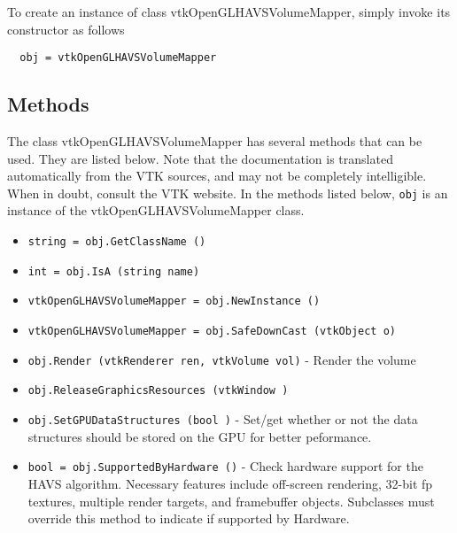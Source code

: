 To create an instance of class vtkOpenGLHAVSVolumeMapper, simply
invoke its constructor as follows
\begin{verbatim}
  obj = vtkOpenGLHAVSVolumeMapper
\end{verbatim}
\subsection{Methods}

The class vtkOpenGLHAVSVolumeMapper has several methods that can be used.
  They are listed below.
Note that the documentation is translated automatically from the VTK sources,
and may not be completely intelligible.  When in doubt, consult the VTK website.
In the methods listed below, \verb|obj| is an instance of the vtkOpenGLHAVSVolumeMapper class.
\begin{itemize}
\item  \verb|string = obj.GetClassName ()|

\item  \verb|int = obj.IsA (string name)|

\item  \verb|vtkOpenGLHAVSVolumeMapper = obj.NewInstance ()|

\item  \verb|vtkOpenGLHAVSVolumeMapper = obj.SafeDownCast (vtkObject o)|

\item  \verb|obj.Render (vtkRenderer ren, vtkVolume vol)| -  Render the volume

\item  \verb|obj.ReleaseGraphicsResources (vtkWindow )|

\item  \verb|obj.SetGPUDataStructures (bool )| -  Set/get whether or not the data structures should be stored on the GPU 
 for better peformance.

\item  \verb|bool = obj.SupportedByHardware ()| -  Check hardware support for the HAVS algorithm.  Necessary
 features include off-screen rendering, 32-bit fp textures, multiple
 render targets, and framebuffer objects.
 Subclasses must override this method to indicate if supported by Hardware.

\end{itemize}
